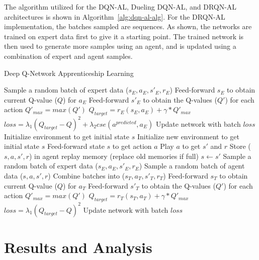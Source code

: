 \documentclass[12pt,american]{report}
\begin{document}
The algorithm utilized for the DQN-AL, Dueling DQN-AL, and DRQN-AL architectures is shown in Algorithm~\ref{alg:dqn-al-alg}. For the DRQN-AL implementation, the batches sampled are sequences. As shown, the networks are trained on expert data first to give it a starting point.  The trained network is then used to generate more samples using an agent, and is updated using a combination of expert and agent samples.

\begin{algorithm}
\caption{Deep Q-Network Apprenticeship Learning}
\label{alg:dqn-al-alg}
\begin{algorithmic} 
\State Sample a random batch of expert data ($s_E,a_E,s'_E,r_E$)
\State Feed-forward $s_E$ to obtain current Q-value ($Q$) for $a_E$
\State Feed-forward $s'_E$ to obtain the Q-values ($Q'$) for each action
\State $Q'_{max} = max(Q')$
\State $Q_{target} = r_E(s_E,a_E) + \gamma *Q'_{max}$
\State $loss =\lambda_{1}(Q_{target}-Q)^2 + \lambda_{2}cse(a^{predicted},a_E)$
\State Update network with batch $loss$
\EndFor
\State Initialize environment to get initial state $s$
\State Initialize new environment to get initial state $s$
\EndIf
\State Feed-forward state $s$ to get action $a$
\State Play $a$ to get $s'$ and $r$
\State Store ($s,a,s',r$) in agent replay memory (replace old memories if full)
\State $s \leftarrow s'$
\State Sample a random batch of expert data ($s_E,a_E,s'_E,r_E$)
\State Sample a random batch of agent data ($s,a,s',r$)
\State Combine batches into ($s_T,a_T,s'_T,r_T$)
\State Feed-forward $s_T$ to obtain current Q-value ($Q$) for $a_T$
\State Feed-forward $s'_T$ to obtain the Q-values ($Q'$) for each action
\State $Q'_{max} = max(Q')$
\State $Q_{target} = r_T(s_T,a_T) + \gamma *Q'_{max}$
\State $loss =\lambda_{1}(Q_{target}-Q)^2$
\State Update network with batch $loss$
\EndIf
\EndFor
\end{algorithmic}
\end{algorithm}

\chapter{Results and Analysis}
\label{sec:results_and_analysis}
\end{document}
